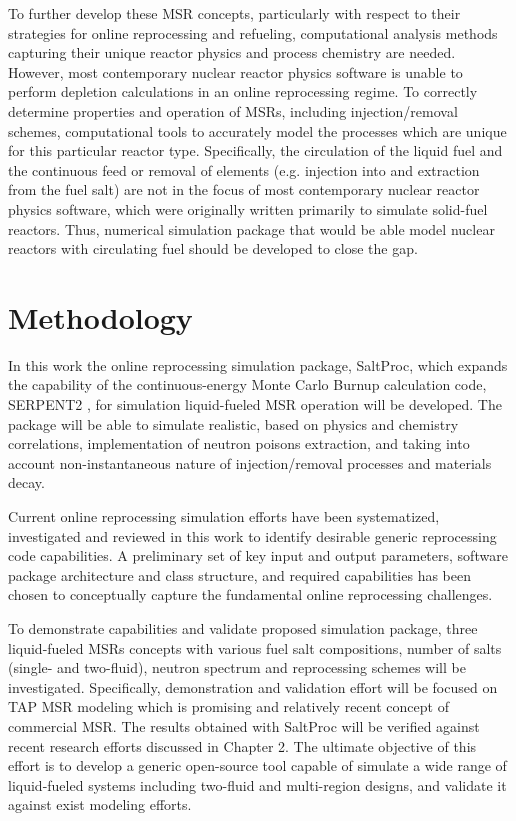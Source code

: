 To further develop these \gls{MSR} concepts, particularly with respect to their  
strategies for online reprocessing and refueling, computational analysis methods capturing their unique reactor physics and process chemistry are needed.
However, most contemporary nuclear reactor physics software is unable to 
perform depletion calculations in an online reprocessing regime. To correctly 
determine properties and operation of \glspl{MSR}, including injection/removal 
schemes, computational tools to accurately model the processes which are unique 
for this particular reactor type. Specifically, the circulation of the
liquid fuel and the continuous feed or removal of elements (e.g. injection into 
and extraction from the fuel salt) are not in the focus of most contemporary 
nuclear reactor physics software, which were originally written primarily to 
simulate solid-fuel reactors. Thus, numerical simulation package that would be 
able model nuclear reactors with circulating fuel should be developed to close 
the gap.

\section{Methodology}
In this work the online reprocessing simulation package, SaltProc, which expands the capability 
of the continuous-energy Monte Carlo Burnup calculation code, SERPENT2 
\cite{leppanen_serpent_2015}, for simulation liquid-fueled \gls{MSR} operation 
will be developed. The package will 
be able to simulate realistic, based on physics and chemistry correlations, 
implementation of neutron poisons extraction, and 
taking into account non-instantaneous nature of injection/removal processes 
and materials decay. 

Current online reprocessing simulation efforts have been systematized, investigated and reviewed in this work to identify desirable generic reprocessing code capabilities. 
A preliminary set of key input and output parameters, software package architecture and 
class structure, and required capabilities has been chosen 
to conceptually capture the fundamental online reprocessing challenges. 

To demonstrate capabilities and validate proposed simulation package, three 
liquid-fueled \glspl{MSR} concepts with various fuel salt compositions, 
number of salts (single- and two-fluid), neutron spectrum and 
reprocessing schemes will be investigated. Specifically, demonstration 
and validation effort will be focused on \gls{TAP} \gls{MSR} modeling 
which is promising and relatively recent concept of commercial \gls{MSR}. 
The results obtained with SaltProc will be verified against recent research 
efforts discussed in Chapter 2. The ultimate objective of this effort is to 
develop a generic open-source tool capable of 
simulate a wide range of liquid-fueled systems including two-fluid and multi-region 
designs, and validate it against exist modeling efforts.
